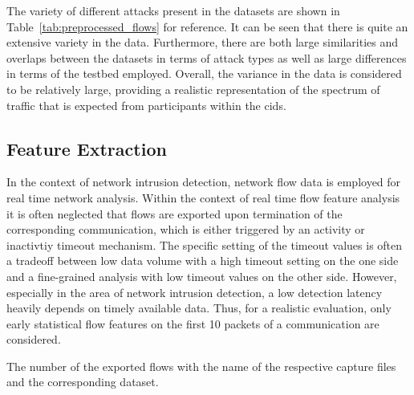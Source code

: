 \documentclass[../../main.tex]{subfiles}
\begin{document}
The variety of different attacks present in the datasets are shown in Table~\ref{tab:preprocessed_flows} for reference. It can be seen that there is quite an extensive variety in the data. Furthermore, there are both large similarities and overlaps between the datasets in terms of attack types as well as large differences in terms of the testbed employed. Overall, the variance in the data is considered to be relatively large, providing a realistic representation of the spectrum of traffic that is expected from participants within the \gls{cids}.

\subsection{Feature Extraction}\label{subsec:feature_extraction}

In the context of network intrusion detection, network flow data is employed for real time network analysis. Within the context of real time flow feature analysis it is often neglected that flows are exported upon termination of the corresponding communication, which is either triggered by an activity or inactivtiy timeout mechanism. The specific setting of the timeout values is often a tradeoff between low data volume with a high timeout setting on the one side and a fine-grained analysis with low timeout values on the other side. However, especially in the area of network intrusion detection, a low detection latency heavily depends on timely available data. Thus, for a realistic evaluation, only early statistical flow features on the first 10 packets of a communication are considered. 

\begin{table}[t]
    \centering
    \footnotesize
    \centering
    \setlength{\extrarowheight}{0pt}
    \addtolength{\extrarowheight}{\aboverulesep}
    \addtolength{\extrarowheight}{\belowrulesep}
    \setlength{\aboverulesep}{0pt}
    \setlength{\belowrulesep}{0pt}
    \setlength{\extrarowheight}{.1em}
    
    \caption[Exported Flows]{The number of the exported flows with the name of the respective capture files and the corresponding dataset.}
    \label{tab:num_exported_flows}
\end{table}
\end{document}
